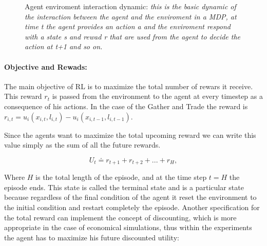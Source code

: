 \begin{figure}[!h]
  \centering
  \linespread{.9}
  \caption[Agent enviroment interaction dynamic: ]%
  {\label{img:a-e_dynamic}Agent enviroment interaction dynamic: \small \textit{this is the basic dynamic of the interaction between the agent and the enviroment in a MDP, at time t the agent provides an action a and the enviroment respond with a state s and rewad r that are used from the agent to decide the action at t+1 and so on.}}
\end{figure}


\paragraph{Objective and Rewads:} The main objective of RL is to maximize the total number of rewars it receive. This reward \( r_t \) is passed from the environment to the agent at every timestep as a consequence of his actions. In the case of the Gather and Trade the reward is \( r_{i,t} = u_i(x_{i,t},l_{i,t})  - u_i(x_{i,t-1},l_{i,t-1}) \). 

Since the agents want to maximize the total upcoming reward we can write this value simply as the sum of all the future rewards.

\begin{equation*}
U_t \doteq r_{t+1} + r_{t+2} + ... + r_{H},
\end{equation*}

Where \( H \) is the total length of the episode, and at the time step \( t = H \) the episode ends. This state is called the terminal state and is a particular state because regardless of the final condition of the agent it reset the environment to the initial condition and restart completely the episode.
Another specification for the total reward can implement the concept of discounting, which is more appropriate in the case of economical simulations, thus within the experiments the agent has to maximize his future discounted utility:

